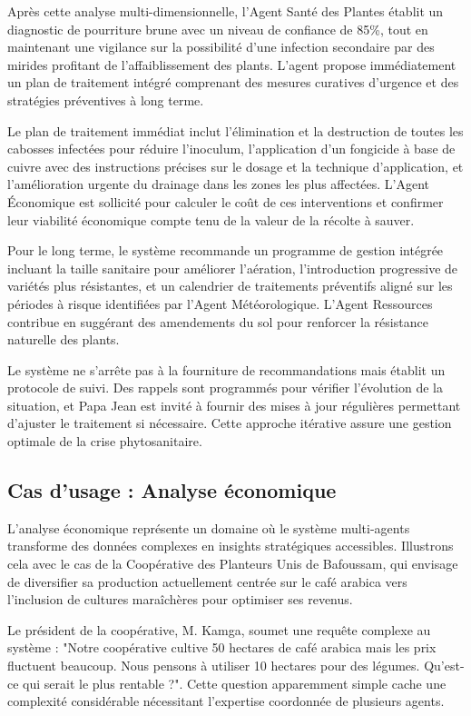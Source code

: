 Après cette analyse multi-dimensionnelle, l'Agent Santé des Plantes établit un diagnostic de pourriture brune avec un niveau de confiance de 85\%, tout en maintenant une vigilance sur la possibilité d'une infection secondaire par des mirides profitant de l'affaiblissement des plants. L'agent propose immédiatement un plan de traitement intégré comprenant des mesures curatives d'urgence et des stratégies préventives à long terme.

Le plan de traitement immédiat inclut l'élimination et la destruction de toutes les cabosses infectées pour réduire l'inoculum, l'application d'un fongicide à base de cuivre avec des instructions précises sur le dosage et la technique d'application, et l'amélioration urgente du drainage dans les zones les plus affectées. L'Agent Économique est sollicité pour calculer le coût de ces interventions et confirmer leur viabilité économique compte tenu de la valeur de la récolte à sauver.

Pour le long terme, le système recommande un programme de gestion intégrée incluant la taille sanitaire pour améliorer l'aération, l'introduction progressive de variétés plus résistantes, et un calendrier de traitements préventifs aligné sur les périodes à risque identifiées par l'Agent Météorologique. L'Agent Ressources contribue en suggérant des amendements du sol pour renforcer la résistance naturelle des plants.

Le système ne s'arrête pas à la fourniture de recommandations mais établit un protocole de suivi. Des rappels sont programmés pour vérifier l'évolution de la situation, et Papa Jean est invité à fournir des mises à jour régulières permettant d'ajuster le traitement si nécessaire. Cette approche itérative assure une gestion optimale de la crise phytosanitaire.

\subsection{Cas d'usage : Analyse économique}

L'analyse économique représente un domaine où le système multi-agents transforme des données complexes en insights stratégiques accessibles. Illustrons cela avec le cas de la Coopérative des Planteurs Unis de Bafoussam, qui envisage de diversifier sa production actuellement centrée sur le café arabica vers l'inclusion de cultures maraîchères pour optimiser ses revenus.

Le président de la coopérative, M. Kamga, soumet une requête complexe au système : "Notre coopérative cultive 50 hectares de café arabica mais les prix fluctuent beaucoup. Nous pensons à utiliser 10 hectares pour des légumes. Qu'est-ce qui serait le plus rentable ?". Cette question apparemment simple cache une complexité considérable nécessitant l'expertise coordonnée de plusieurs agents.

